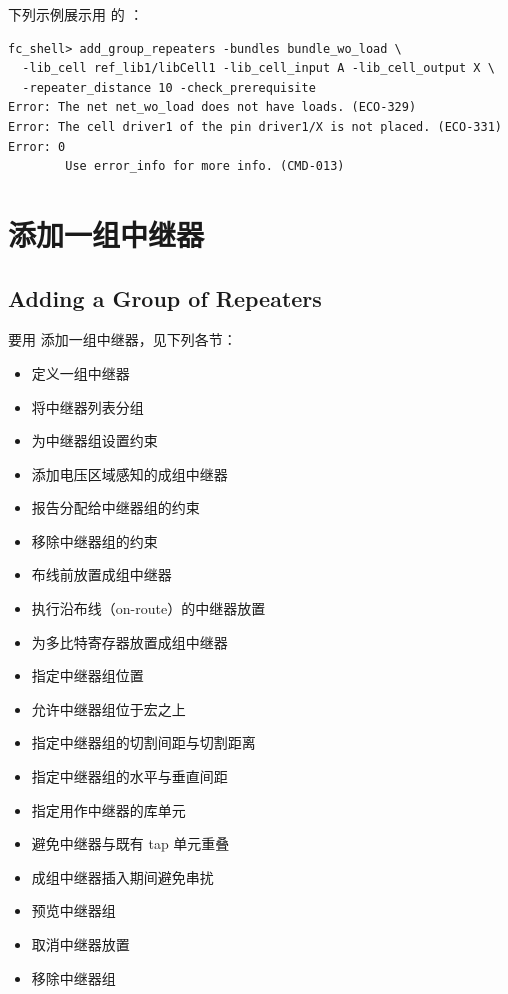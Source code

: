 下列示例展示用  的 ：
\begin{lstlisting}
fc_shell> add_group_repeaters -bundles bundle_wo_load \
  -lib_cell ref_lib1/libCell1 -lib_cell_input A -lib_cell_output X \
  -repeater_distance 10 -check_prerequisite
Error: The net net_wo_load does not have loads. (ECO-329)
Error: The cell driver1 of the pin driver1/X is not placed. (ECO-331)
Error: 0
        Use error_info for more info. (CMD-013)
\end{lstlisting}

\section{添加一组中继器}
\subsection*{Adding a Group of Repeaters}

要用  添加一组中继器，见下列各节：
\begin{itemize}
  \item 定义一组中继器
  \item 将中继器列表分组
  \item 为中继器组设置约束
  \item 添加电压区域感知的成组中继器
  \item 报告分配给中继器组的约束
  \item 移除中继器组的约束
  \item 布线前放置成组中继器
  \item 执行沿布线（on-route）的中继器放置
  \item 为多比特寄存器放置成组中继器
  \item 指定中继器组位置
  \item 允许中继器组位于宏之上
  \item 指定中继器组的切割间距与切割距离
  \item 指定中继器组的水平与垂直间距
  \item 指定用作中继器的库单元
  \item 避免中继器与既有 tap 单元重叠
  \item 成组中继器插入期间避免串扰
  \item 预览中继器组
  \item 取消中继器放置
  \item 移除中继器组
\end{itemize}

